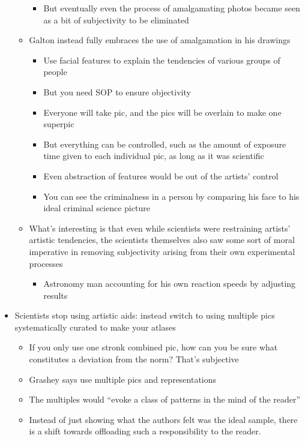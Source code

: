 \documentclass[a4paper]{article}
\begin{document}
\begin{itemize}
\begin{itemize}[label=$\circ$]
\begin{itemize}[label=\tiny$\blacksquare$]
			\item But eventually even the process of amalgamating photos became seen as  a bit of subjectivity to be eliminated
		\end{itemize}
		\item Galton instead fully embraces the use of amalgamation in his drawings
		\begin{itemize}[label=\tiny$\blacksquare$]
			\item Use facial features to explain the tendencies of various groups of people
			\item But you need SOP to ensure objectivity
			\item Everyone will take pic, and the pics will be overlain to make one superpic
			\item But everything can be controlled, such as the amount of exposure time given to each individual pic, as long as it was scientific
			\item Even abstraction of features would be out of the artists’ control
			\item You can see the criminalness in a person by comparing his face to his ideal criminal science picture
		\end{itemize}
		\item What’s interesting is that even while scientists were restraining artists’ artistic tendencies, the scientists themselves also saw some sort of moral imperative in removing subjectivity arising from their own experimental processes
		\begin{itemize}[label=$\circ$]
			\item Astronomy man accounting for his own reaction speeds by adjusting results
		\end{itemize}
	\end{itemize}
	\item Scientists stop using artistic aids: instead switch to using multiple pics systematically curated to make your atlases
	\begin{itemize}[label=$\circ$]
		\item If you only use one stronk combined pic, how can you be sure what constitutes a deviation from the norm? That's subjective
		\item Grashey says use multiple pics and representations
		\item The multiples would ``evoke a class of patterns in the mind of the reader''
		\item Instead of just showing what the authors felt was the ideal sample, there is a shift towards offloading such a responsibility to the reader.

\end{itemize}
\end{itemize}
\end{document}
